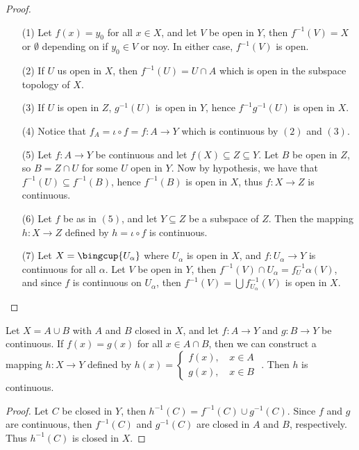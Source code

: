 \begin{proof}
    \begin{enumerate}
        \item[(1)] Let $f (x)=y_0$ for all $x \in X$, and let  $V$ be open in  $Y$, then  $f^{-1}(V)=X$
            or $\emptyset$ depending on if $ y_0 \in V$ or noy. In either case, $f^{-1}(V)$ is open.

        \item[(2)] If $U$ us open in  $X$, then  $f^{-1}(U)=U \cap A$ which is open in the subspace
            topology of $X$.

        \item[(3)] If $U$ is open in  $Z$,  $g^{-1}(U)$ is open in $Y$, hence  $f^{-1}g^{-1}(U)$ is
            open in $X$.

        \item[(4)] Notice that  $f_A=\iota \circ f=f:A \rightarrow Y$ which is continuous by $(2)$
            and $(3)$.

        \item[(5)] Let $f:A \rightarrow Y$ be continuous and let  $f(X) \subseteq Z \subseteq Y$. Let $B$
            be open in  $Z$, so  $B=Z \cap U$ for some  $U$ open in  $Y$. Now by hypothesis, we have
            that $f^{-1}(U) \subseteq f^{-1}(B)$, hence $f^{-1}(B)$ is open in $X$, thus  $f:X
            \rightarrow Z$ is continuous.

        \item[(6)] Let  $f$ be as in  $(5)$, and let $Y \subseteq Z$ be a subspace of  $Z$. Then the
            mapping  $h:X \rightarrow Z$ defined by $h=\iota \circ f$ is continuous.

        \item[(7)] Let  $X=\bingcup{U_{\alpha}}$ where $U_{\alpha}$ is open in $X$, and $f:U_{\alpha}
            \rightarrow Y$ is continuous for all  $\alpha$. Let $V$ be open in  $Y$, then
            $f^{-1}(V) \cap U_{\alpha}=f^{-1}_U{\alpha}(V)$, and since $f$ is continuous on
            $U_{\alpha}$, then $f^{-1}(V)=\bigcup{f^{-1}_{U_{\alpha}}(V)}$ is open in $X$.
    \end{enumerate}
\end{proof}

\begin{theorem}\label{1.7.4}
    Let $X=A \cup B$ with  $A$ and  $B$ closed in  $X$, and let  $f:A \rightarrow Y$ and  $g:B
    \rightarrow Y$ be continuous. If  $f(x)=g(x)$ for all $x \in A \cap B$, then we can
    construct a mapping  $h:X \rightarrow Y$ defined by  $h(x)=
        \begin{cases}
            f(x) \text{, } & x \in A \\
            g(x) \text{, } & x \in B
        \end{cases}$
    . Then $h$ is continuous.
\end{theorem}
\begin{proof}
    Let $C$ be closed in  $Y$, then  $h^{-1}(C)=f^{-1}(C) \cup g^{-1}(C)$. Since $f$ and  $g$ are
    continuous, then  $f^{-1}(C)$ and $g^{-1}(C)$ are closed in $A$ and  $B$, respectively. Thus
    $h^{-1}(C)$ is closed in $X$.
\end{proof}

